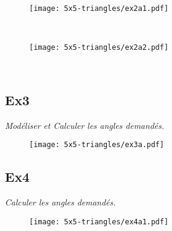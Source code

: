 \begin{minipage}[t]{0.4\textwidth}
\begin{figure}[H]
  \centering
  \texttt{[image: 5x5-triangles/ex2a1.pdf]}
\end{figure}
\end{minipage}
\begin{minipage}[t]{0.6\textwidth}
  \Pointilles[8] \\
\end{minipage}

\begin{minipage}[t]{0.4\textwidth}
\begin{figure}[H]
  \centering
  \texttt{[image: 5x5-triangles/ex2a2.pdf]}
\end{figure}
\end{minipage}
\begin{minipage}[t]{0.6\textwidth}
  \Pointilles[8] \\
\end{minipage}


\subsection*{Ex3}
\textit{Modéliser et Calculer les angles demandés.}

\begin{figure}[H]
  \centering
  \texttt{[image: 5x5-triangles/ex3a.pdf]}
\end{figure}

\begin{multicols}{4}
\Pointilles[4] 
\columnbreak 

\Pointilles[4] 
\columnbreak 

\Pointilles[4] 
\columnbreak 

\Pointilles[4] 
\columnbreak 
\end{multicols}


\subsection*{Ex4}
\textit{Calculer les angles demandés.}

\begin{minipage}[t]{0.4\textwidth}
  \begin{figure}[H]
    \centering
    \texttt{[image: 5x5-triangles/ex4a1.pdf]}
  \end{figure}
\end{minipage}
\begin{minipage}[t]{0.6\textwidth}
  \Pointilles[10] \\
\end{minipage}

